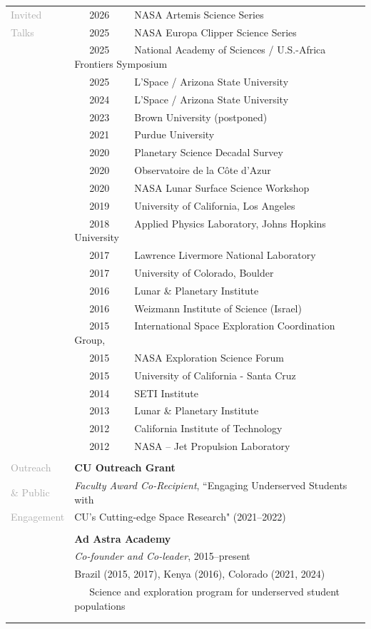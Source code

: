 \documentclass[letterpaper,10pt,twoside]{article}
\begin{document}
 \noindent \begin{tabular}{@{} l l}
 \large{\textcolor{darkgray}{Invited}} & ~~~2026~~~~~NASA Artemis Science Series\\
 \large{\textcolor{darkgray}{Talks}} & ~~~2025~~~~~NASA Europa Clipper Science Series\\
 & ~~~2025~~~~~National Academy of Sciences / U.S.-Africa Frontiers Symposium\\
 & ~~~2025~~~~~L'Space / Arizona State University\\
 & ~~~2024~~~~~L'Space / Arizona State University\\
 & ~~~2023~~~~~Brown University (postponed) \\
 & ~~~2021~~~~~Purdue University \\
 & ~~~2020~~~~~Planetary Science Decadal Survey\\
 & ~~~2020~~~~~Observatoire de la Côte d'Azur \\
 & ~~~2020~~~~~NASA Lunar Surface Science Workshop \\
 & ~~~2019~~~~~University of California, Los Angeles \\
 & ~~~2018~~~~~Applied Physics Laboratory, Johns Hopkins University \\
 & ~~~2017~~~~~Lawrence Livermore National Laboratory \\
 & ~~~2017~~~~~University of Colorado, Boulder \\
 & ~~~2016~~~~~Lunar \& Planetary Institute \\
 & ~~~2016~~~~~Weizmann Institute of Science (Israel) \\
 & ~~~2015~~~~~International Space Exploration Coordination Group, \\
 & ~~~2015~~~~~NASA Exploration Science Forum \\
 & ~~~2015~~~~~University of California - Santa Cruz \\
 & ~~~2014~~~~~SETI Institute \\
 & ~~~2013~~~~~Lunar \& Planetary Institute \\
 & ~~~2012~~~~~California Institute of Technology \\
 & ~~~2012~~~~~NASA -- Jet Propulsion Laboratory \\
 & \\
\large{\textcolor{darkgray}{Outreach}} & \textbf{CU Outreach Grant} \\
\large{\textcolor{darkgray}{\& Public}} & \textit{Faculty Award Co-Recipient}, ``Engaging Underserved Students with \\
\large{\textcolor{darkgray}{Engagement}} & \hspace{0.25in} CU’s Cutting-edge Space Research" (2021--2022)\\
 & \\
 & \textbf{Ad Astra Academy} \\
& \textit{Co-founder and Co-leader}, 2015--present\\
& Brazil (2015, 2017), Kenya (2016), Colorado (2021, 2024) \\
& ~~~Science and exploration program for underserved student populations \\
& \\
& \\


\end{tabular}
\end{document}
